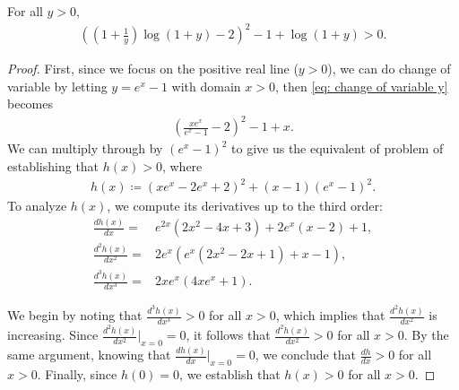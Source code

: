 \documentclass[10pt,a4paper]{amsart}
\begin{document}
\begin{lemma} \label{lemma: change of variable y > 0}
    For all $y>0$,
    \begin{align} \label{eq: change of variable y}
    \left(\left(1+\frac{1}{y}\right) \log(1+y) - 2\right)^2 - 1 + \log(1+y) > 0.
    \end{align}
\end{lemma}

\begin{proof}
    First, since we focus on the positive real line ($y > 0$), we can do change of variable by letting $y = e^x - 1$ with domain $x > 0$, then \eqref{eq: change of variable y} becomes
    \begin{align*}
        \left( \frac{x e^x}{e^x - 1} - 2 \right)^2 - 1 + x
        .
    \end{align*}
    We can multiply through by $(e^x -1)^2$ to give us the equivalent of problem of establishing that $h(x)>0$, where
    \begin{align*}
        h(x) \coloneqq (x e^x - 2 e^x + 2)^2 + (x-1) (e^x - 1)^2.
    \end{align*}
    To analyze $h(x)$, we compute its derivatives up to the third order:
    \begin{align*}
    \frac{d h(x)}{d x} =& e^{2x}\left(2x^{2}-4x+3\right)+2e^{x}\left(x-2\right)+1 , \\
    \frac{d^2 h(x)}{d x^2} =& 2e^x\left(e^x\left(2x^2-2x+1\right)+x-1\right) , \\
    \frac{d^3 h(x)}{d x^3} =& 2 x e^x (4 x e^x + 1).
    \end{align*}

    We begin by noting that \( \frac{d^3 h(x)}{d x^3} > 0 \) for all \( x > 0 \), which implies that \( \frac{d^2 h(x)}{d x^2} \) is increasing. Since \( \frac{d^2 h(x)}{d x^2} \big|_{x=0} = 0 \), it follows that \( \frac{d^2 h(x)}{d x^2} > 0 \) for all \( x > 0 \). By the same argument, knowing that \( \frac{d h(x)}{d x} \big|_{x=0} = 0 \), we conclude that \( \frac{d h}{d x} > 0 \) for all \( x > 0 \). Finally, since \( h(0) = 0 \), we establish that \( h(x) > 0 \) for all \( x > 0 \).
\end{proof}
\end{document}
